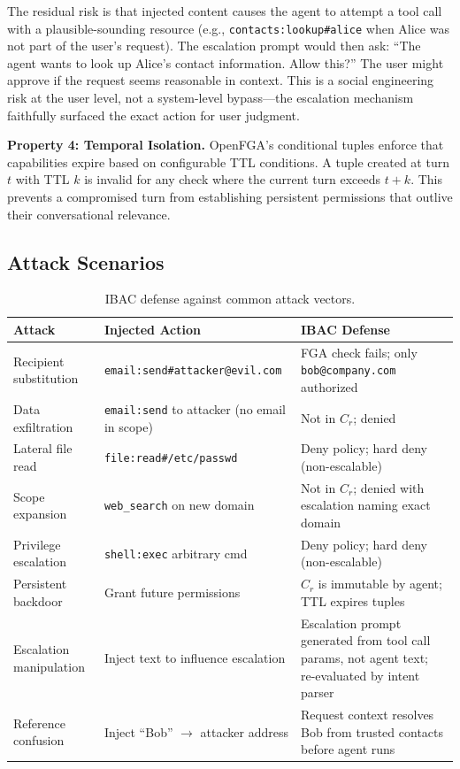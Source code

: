 \documentclass[11pt]{article}
\begin{document}
The residual risk is that injected content causes the agent to attempt a tool call with a plausible-sounding resource (e.g., \texttt{contacts:lookup\#alice} when Alice was not part of the user's request). The escalation prompt would then ask: ``The agent wants to look up Alice's contact information. Allow this?'' The user might approve if the request seems reasonable in context. This is a social engineering risk at the user level, not a system-level bypass---the escalation mechanism faithfully surfaced the exact action for user judgment.

\textbf{Property 4: Temporal Isolation.}
OpenFGA's conditional tuples enforce that capabilities expire based on configurable TTL conditions. A tuple created at turn $t$ with TTL $k$ is invalid for any check where the current turn exceeds $t + k$. This prevents a compromised turn from establishing persistent permissions that outlive their conversational relevance.

\subsection{Attack Scenarios}

\begin{table}[t]
\centering
\caption{IBAC defense against common attack vectors.}
\label{tab:attacks}
\small
\begin{tabularx}{\textwidth}{lXX}
\toprule
\textbf{Attack} & \textbf{Injected Action} & \textbf{IBAC Defense} \\
\midrule
Recipient substitution & \texttt{email:send\#attacker@evil.com} & FGA check fails; only \texttt{bob@company.com} authorized \\
Data exfiltration & \texttt{email:send} to attacker (no email in scope) & Not in $C_r$; denied \\
Lateral file read & \texttt{file:read\#/etc/passwd} & Deny policy; hard deny (non-escalable) \\
Scope expansion & \texttt{web\_search} on new domain & Not in $C_r$; denied with escalation naming exact domain \\
Privilege escalation & \texttt{shell:exec} arbitrary cmd & Deny policy; hard deny (non-escalable) \\
Persistent backdoor & Grant future permissions & $C_r$ is immutable by agent; TTL expires tuples \\
Escalation manipulation & Inject text to influence escalation & Escalation prompt generated from tool call params, not agent text; re-evaluated by intent parser \\
Reference confusion & Inject ``Bob'' $\rightarrow$ attacker address & Request context resolves Bob from trusted contacts before agent runs \\
\bottomrule
\end{tabularx}
\end{table}
\end{document}
